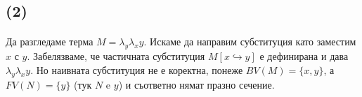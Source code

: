 \documentclass[12pt]{article}
\begin{document}
\begin{enumerate}
\subsection*{(2)}
\paragraph*{}
Да разгледаме терма $M = \lambda_y \lambda_x y$. Искаме да направим субституция като заместим $x$ с $y$. Забелязваме, че частичната субституция $M[x \hookrightarrow y]$ е дефинирана и дава $\lambda_y \lambda_x y$. Но наивната субституция не е коректна, понеже $BV(M) = \{ x, y \}$, а $FV(N) = \{ y \}$ (тук $N$ e $y$) и съответно нямат празно сечение.

\end{enumerate}
\end{document}
